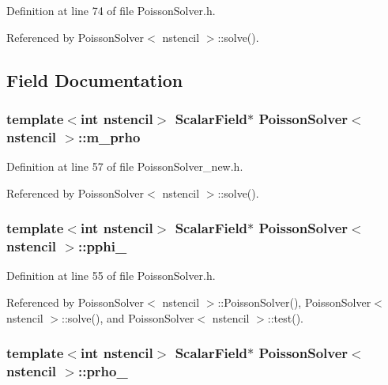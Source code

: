 Definition at line 74 of file PoissonSolver.h.



Referenced by PoissonSolver$<$ nstencil $>$::solve().



\subsection{Field Documentation}
\subsubsection[{m\_\-prho}]{\setlength{\rightskip}{0pt plus 5cm}template$<$int nstencil$>$ {\bf ScalarField}$\ast$ {\bf PoissonSolver}$<$ nstencil $>$::{\bf m\_\-prho}}\label{classPoissonSolver_abc1e13ccea710525220e970d74397ff4}


Definition at line 57 of file PoissonSolver\_\-new.h.



Referenced by PoissonSolver$<$ nstencil $>$::solve().

\subsubsection[{pphi\_\-}]{\setlength{\rightskip}{0pt plus 5cm}template$<$int nstencil$>$ {\bf ScalarField}$\ast$ {\bf PoissonSolver}$<$ nstencil $>$::{\bf pphi\_\-}}\label{classPoissonSolver_a3dc6dd8a072a8b59733a193d8795f04c}


Definition at line 55 of file PoissonSolver.h.



Referenced by PoissonSolver$<$ nstencil $>$::PoissonSolver(), PoissonSolver$<$ nstencil $>$::solve(), and PoissonSolver$<$ nstencil $>$::test().

\subsubsection[{prho\_\-}]{\setlength{\rightskip}{0pt plus 5cm}template$<$int nstencil$>$ {\bf ScalarField}$\ast$ {\bf PoissonSolver}$<$ nstencil $>$::{\bf prho\_\-}}\label{classPoissonSolver_ae63b29dc18467f15d9258dd1d6869c6f}


